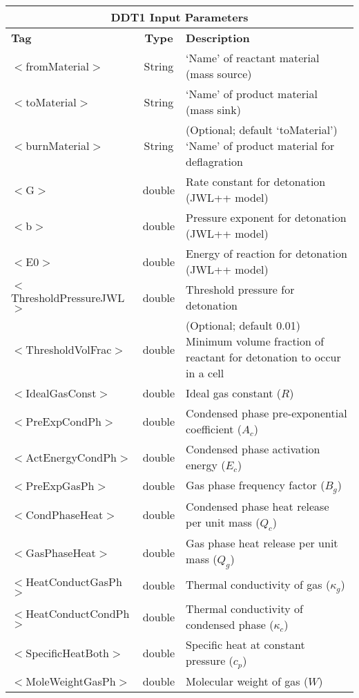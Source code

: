 \begin{center}
\begin{tabular}{| l | c | p{7cm} |}
\hline
  \multicolumn{3}{|c|}{\textbf{DDT1 Input Parameters}} \\
\hline
\hline
  \textbf{Tag} & \textbf{Type} & \textbf{Description}\\
\hline
  $<$fromMaterial$>$ & String & `Name' of reactant material (mass source)\\
\hline
  $<$toMaterial$>$ & String & `Name' of product material (mass sink)\\
\hline
  $<$burnMaterial$>$ & String & (Optional; default `toMaterial') `Name' of product material for deflagration\\
\hline
  $<$G$>$ & double & Rate constant for detonation (JWL++ model) \\
\hline
  $<$b$>$ & double & Pressure exponent for detonation (JWL++ model) \\
\hline
  $<$E0$>$ & double & Energy of reaction for detonation (JWL++ model) \\
\hline
  $<$ThresholdPressureJWL$>$ & double & Threshold pressure for detonation \\
\hline
  $<$ThresholdVolFrac$>$ & double & (Optional; default 0.01) Minimum volume fraction of reactant for detonation to occur in a cell \\
\hline
  $<$IdealGasConst$>$ & double & Ideal gas constant ($R$) \\
\hline
  $<$PreExpCondPh$>$ & double & Condensed phase pre-exponential coefficient ($A_c$) \\
\hline
  $<$ActEnergyCondPh$>$ & double & Condensed phase activation energy ($E_c$)  \\
\hline
  $<$PreExpGasPh$>$ & double & Gas phase frequency factor ($B_g$)  \\
\hline
  $<$CondPhaseHeat$>$ & double & Condensed phase heat release per unit mass ($Q_c$)  \\
\hline
  $<$GasPhaseHeat$>$ & double & Gas phase heat release per unit mass ($Q_g$)  \\
\hline
  $<$HeatConductGasPh$>$ & double & Thermal conductivity of gas ($\kappa_g$) \\
\hline
  $<$HeatConductCondPh$>$ & double & Thermal conductivity of condensed phase ($\kappa_c$) \\
\hline
  $<$SpecificHeatBoth$>$ & double & Specific heat at constant pressure ($c_p$)  \\
\hline
  $<$MoleWeightGasPh$>$ & double & Molecular weight of gas ($W$)  \\

\end{tabular}
\end{center}
